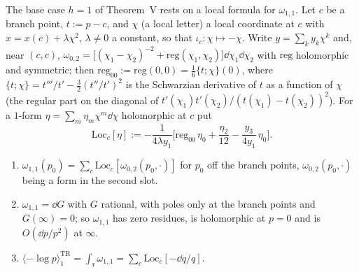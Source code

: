 The base case $h=1$ of Theorem~V rests on a local formula for $\omega_{1,1}$. Let $c$ be a branch point, $t:=p-c$, and $\chi$ (a local letter) a local coordinate at $c$ with $x=x(c)+\lambda\chi^2$, $\lambda\neq 0$ a constant, so that $\iota_c\colon\chi\mapsto-\chi$. Write $y=\sum_ky_k\chi^k$ and, near $(c,c)$, $\omega_{0,2}=\big[(\chi_1-\chi_2)^{-2}+\mathrm{reg}(\chi_1,\chi_2)\big]\dd\chi_1\dd\chi_2$ with $\mathrm{reg}$ holomorphic and symmetric; then $\mathrm{reg}_{00}:=\mathrm{reg}(0,0)=\frac16\{t;\chi\}(0)$, where $\{t;\chi\}=t'''/t'-\frac32(t''/t')^2$ is the Schwarzian derivative of $t$ as a function of $\chi$ (the regular part on the diagonal of $t'(\chi_1)t'(\chi_2)/(t(\chi_1)-t(\chi_2))^2$). For a $1$-form $\eta=\sum_m\eta_m\chi^m\dd\chi$ holomorphic at $c$ put
\begin{equation}
\label{eq:mod-loc}
\mathrm{Loc}_c[\eta]:=-\frac{1}{4\lambda y_1}\Big[\mathrm{reg}_{00}\,\eta_0+\frac{\eta_2}{12}-\frac{y_3}{4y_1}\,\eta_0\Big].
\end{equation}

\begin{lem}
\label{lem:mod-w11}
\begin{enumerate}
\item $\omega_{1,1}(p_0)=\sum_c\mathrm{Loc}_c[\omega_{0,2}(p_0,\cdot)]$ for $p_0$ off the branch points, $\omega_{0,2}(p_0,\cdot)$ being a form in the second slot.
\item $\omega_{1,1}=\dd G$ with $G$ rational, with poles only at the branch points and $G(\infty)=0$; so $\omega_{1,1}$ has zero residues, is holomorphic at $p=0$ and is $O(\dd p/p^2)$ at $\infty$.
\item $\langle-\log p\rangle^{\mathrm{TR}}_1=\int_{\mathfrak r}\omega_{1,1}=\sum_c\mathrm{Loc}_c[-\dd q/q]$.
\end{enumerate}
\end{lem}

